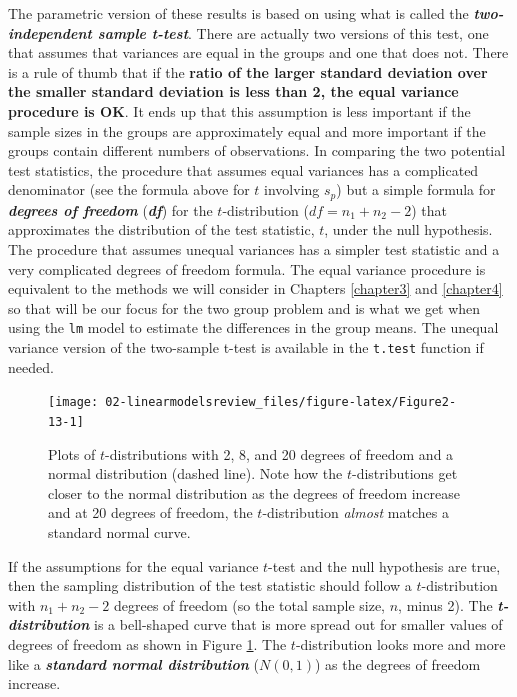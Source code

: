 \documentclass[
]{book}
\begin{document}
\indent The parametric version
of these results is based on using what is called
the \textbf{\emph{two-independent sample t-test}}. There are actually two versions of this
test, one that assumes that variances are equal in the groups and one that
does not. There is a rule of thumb that if the \textbf{ratio of the larger standard
deviation over the smaller standard deviation is less than 2, the equal variance
procedure is OK}. It ends up that this assumption
is less important if the sample sizes in the groups are approximately equal
and more important if the groups contain different numbers of observations. In
comparing the two potential test statistics, the procedure that assumes equal
variances has a complicated denominator (see the formula above for \(t\)
involving \(s_p\)) but a simple formula for \textbf{\emph{degrees of freedom}} (\textbf{\emph{df}})
for the \(t\)-distribution (\(df = n_1+n_2-2\)) that approximates the
distribution of the test statistic, \(t\), under the null hypothesis. The
procedure that assumes unequal variances has a simpler test statistic and a
very complicated degrees of freedom formula. The equal variance procedure is
equivalent to the methods we will consider in Chapters
\ref{chapter3} and \ref{chapter4} so that
will be our focus for the two group problem and is what we get when using the \texttt{lm} model to estimate the differences in the group means. The unequal variance version of the two-sample t-test is available in the \texttt{t.test} function if needed.



\begin{figure}[ht!]

{\centering \texttt{[image: 02-linearmodelsreview\_files/figure-latex/Figure2-13-1]} 

}

\caption{Plots of \(t\)-distributions with 2, 8, and 20 degrees of freedom and a normal distribution (dashed line). Note how the \(t\)-distributions get closer to the normal distribution as the degrees of freedom increase and at 20 degrees of freedom, the \(t\)-distribution \emph{almost} matches a standard normal curve.}\label{fig:Figure2-13}
\end{figure}

\indent If the assumptions for the equal variance \(t\)-test and the null
hypothesis are true, then the sampling distribution of the test statistic should
follow a \(t\)-distribution
with \(n_1+n_2-2\) degrees of freedom (so the total sample size, \(n\), minus 2). The \textbf{\emph{t-distribution}} is a bell-shaped curve that is more spread out for smaller
values of degrees of freedom as shown in Figure \ref{fig:Figure2-13}. The
\(t\)-distribution looks more and more like a \textbf{\emph{standard normal distribution}}
(\(N(0,1)\)) as the degrees of freedom increase.
\end{document}
